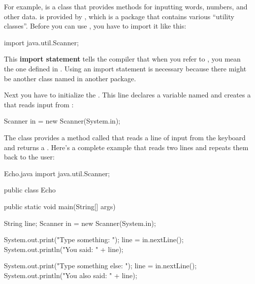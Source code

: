 
For example,  is a class that provides methods for inputting words, numbers, and other data.
 is provided by , which is a package that contains various ``utility classes''.
Before you can use , you have to import it like this:

\begin{code}
import java.util.Scanner;
\end{code}


This {\bf import statement} tells the compiler that when you refer to , you mean the one defined in .
Using an import statement is necessary because there might be another class named  in another package.

Next you have to initialize the .
This line declares a  variable named  and creates a  that reads input from :


\begin{code}
Scanner in = new Scanner(System.in);
\end{code}

The  class provides a method called  that reads a line of input from the keyboard and returns a .
Here's a complete example that reads two lines and repeats them back to the user:


\begin{trinket}{Echo.java}
import java.util.Scanner;

public class Echo {

    public static void main(String[] args) {
        String line;
        Scanner in = new Scanner(System.in);

        System.out.print("Type something: ");
        line = in.nextLine();
        System.out.println("You said: " + line);

        System.out.print("Type something else: ");
        line = in.nextLine();
        System.out.println("You also said: " + line);
    }
}
\end{trinket}

